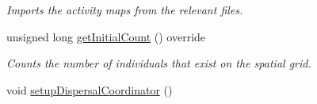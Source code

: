 \begin{DoxyCompactItemize}
\begin{DoxyCompactList}\small\item\em Imports the activity maps from the relevant files. \end{DoxyCompactList}\item 
unsigned long \hyperlink{class_spatial_tree_a05ac9205ab49dbe6056522722372063b}{get\+Initial\+Count} () override
\begin{DoxyCompactList}\small\item\em Counts the number of individuals that exist on the spatial grid. \end{DoxyCompactList}\item 
void \hyperlink{class_spatial_tree_a3ce93c4d62367f17dd523cab4cc35ae8}{setup\+Dispersal\+Coordinator} ()\hypertarget{class_spatial_tree_a3ce93c4d62367f17dd523cab4cc35ae8}{}\label{class_spatial_tree_a3ce93c4d62367f17dd523cab4cc35ae8}


\end{DoxyCompactItemize}

